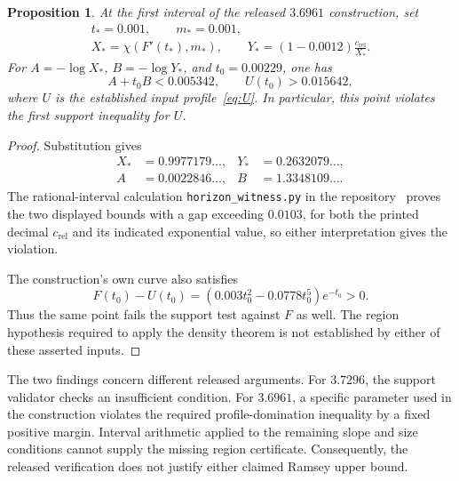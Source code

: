 \documentclass[11pt]{article}
\newtheorem{proposition}[theorem]{Proposition}
\theoremstyle{definition}
\theoremstyle{remark}
\numberwithin{equation}{section}
\begin{document}
\begin{proposition}\label{prop:D-witness}
At the first interval of the released $3.6961$ construction, set
\begin{gather*}
 t_*=0.001,\qquad m_*=0.001,\\
 X_* =\chi(F'(t_*),m_*),\qquad
 Y_*=(1-0.0012)\frac{c_{\mathrm{rel}}}{X_*}.
\end{gather*}
For $A=-\log X_*$, $B=-\log Y_*$, and $t_0=0.00229$, one has
\[
 A+t_0B<0.005342,\qquad U(t_0)>0.015642,
\]
where $U$ is the established input profile~\eqref{eq:U}. In particular, this point violates the first support inequality for $U$.
\end{proposition}
\begin{proof}
Substitution gives
\begin{align*}
 X_*&=0.9977179\ldots, &Y_*&=0.2632079\ldots,\\
 A&=0.0022846\ldots, &B&=1.3348109\ldots.
\end{align*}
The rational-interval calculation \texttt{horizon\_witness.py} in the repository~\cite{Artifact} proves the two displayed bounds with a gap exceeding $0.0103$, for both the printed decimal $c_{\mathrm{rel}}$ and its indicated exponential value, so either interpretation gives the violation.

The construction's own curve also satisfies
\[
 F(t_0)-U(t_0)=(0.003t_0^2-0.0778t_0^5)e^{-t_0}>0.
\]
Thus the same point fails the support test against $F$ as well. The region hypothesis required to apply the density theorem is not established by either of these asserted inputs.
\end{proof}
The two findings concern different released arguments. For $3.7296$, the support validator checks an insufficient condition. For $3.6961$, a specific parameter used in the construction violates the required profile-domination inequality by a fixed positive margin. Interval arithmetic applied to the remaining slope and size conditions cannot supply the missing region certificate. Consequently, the released verification does not justify either claimed Ramsey upper bound.
\end{document}
